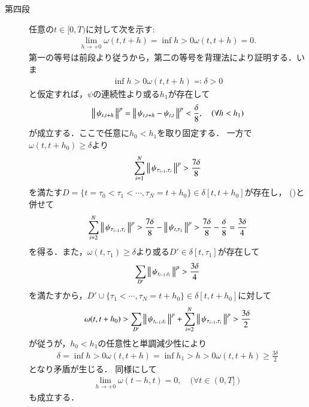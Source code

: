 \begin{prf}
\begin{description}
			\item[第四段]
				任意の$t \in [0,T)$に対して次を示す:
				\begin{align}
					\lim_{h \to +0} \omega(t,t+h) = \inf{h>0}{\omega(t,t+h)} = 0.
				\end{align}
				第一の等号は前段より従うから，第二の等号を背理法により証明する．いま
				\begin{align}
					\inf{h>0}{\omega(t,t+h)} \eqqcolon \delta > 0
					\label{eq:thm_continuity_of_norm_val_p_variation_2}
				\end{align}
				と仮定すれば，$\psi$の連続性より或る$h_1$が存在して
				\begin{align}
					\left\|\, \psi_{t,t+h}\, \right\|_{}^p
					 = \left\|\, \psi_{t,t+h} - \psi_{t,t}\, \right\|_{}^p
					 < \frac{\delta}{8},
					\quad (\forall h < h_1)
					\label{eq:thm_continuity_of_norm_val_p_variation_1}
				\end{align}
				が成立する．ここで任意に$h_0 < h_1$を取り固定する．
				一方で$\omega(t,t+h_0) \geq \delta$より
				\begin{align}
					\sum_{i=1}^{N} \left\|\, \psi_{\tau_{i-1},\tau_i}\, \right\|_{}^p > \frac{7\delta}{8}
				\end{align}
				を満たす$D = \{t = \tau_0 < \tau_1 < \cdots, \tau_N = t+h_0\} \in \delta[t,t+h_0]$が存在し，
				()と併せて
				\begin{align}
					\sum_{i=2}^{N} \left\|\, \psi_{\tau_{i-1},\tau_i}\, \right\|_{}^p
					> \frac{7\delta}{8} - \left\|\, \psi_{t,\tau_1}\, \right\|_{}^p
					>\frac{7\delta}{8} - \frac{\delta}{8}
					= \frac{3 \delta}{4}
				\end{align}
				を得る．また，$\omega(t,\tau_1) \geq \delta$より或る$D' \in \delta[t,\tau_1]$が存在して
				\begin{align}
					\sum_{D'} \left\|\, \psi_{t_{i-1},t_i}\, \right\|_{}^p > \frac{3 \delta}{4}
				\end{align}
				を満たすから，$D' \cup \{\tau_1 < \cdots, \tau_N = t+h_0\} \in \delta[t,t+h_0]$に対して
				\begin{align}
					\omega(t,t+h_0) > \sum_{D'} \left\|\, \psi_{t_{i-1},t_i}\, \right\|_{}^p + \sum_{i=2}^{N} \left\|\, \psi_{\tau_{i-1},\tau_i}\, \right\|_{}^p
					> \frac{3\delta}{2}
				\end{align}
				が従うが，$h_0 < h_1$の任意性と単調減少性により
				\begin{align}
					\delta = \inf{h>0}{\omega(t,t+h)} = \inf{h_1>h>0}{\omega(t,t+h)} \geq \frac{3\delta}{2}
				\end{align}
				となり矛盾が生じる．
				同様にして
				\begin{align}
					\lim_{h \to +0} \omega(t-h,t) = 0,
					\quad (\forall t \in (0,T])
				\end{align}
				も成立する．
				

\end{description}
\end{prf}
